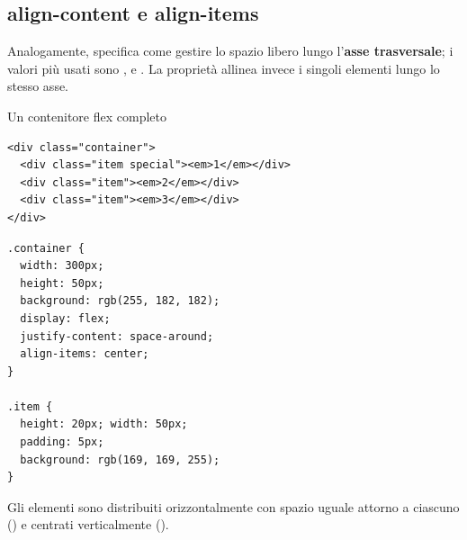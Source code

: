 \subsection{align-content e align-items}

Analogamente,  specifica come gestire lo spazio libero lungo
l'\textbf{asse trasversale}; i valori più usati sono ,
 e . La proprietà  allinea invece
i singoli elementi lungo lo stesso asse.

\begin{esempio}{Un contenitore flex completo}
\begin{affianco}[0.52]
\begin{lstlisting}[style=html, name=flex.html]
<div class="container">
  <div class="item special"><em>1</em></div>
  <div class="item"><em>2</em></div>
  <div class="item"><em>3</em></div>
</div>
\end{lstlisting}

\begin{lstlisting}[style=css, name=flex.css]
.container {
  width: 300px;
  height: 50px;
  background: rgb(255, 182, 182);
  display: flex;
  justify-content: space-around;
  align-items: center;
}

.item {
  height: 20px; width: 50px;
  padding: 5px;
  background: rgb(169, 169, 255);
}
\end{lstlisting}

\risultato
\begin{browser}
\end{browser}
\end{affianco}

Gli elementi sono distribuiti orizzontalmente con spazio uguale attorno a
ciascuno () e centrati verticalmente
().
\end{esempio}


